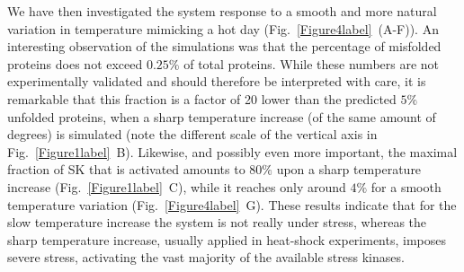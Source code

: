 \documentclass[oneside, 10pt, a4paper, twocolumn]{article}
\begin{document}
{We have then investigated} the system response to a smooth and more natural variation in temperature mimicking a hot day (Fig.~\ref{Figure4label}~(A-F)).
An interesting observation of the simulations was that the percentage of misfolded proteins does not exceed $0.25 \%$ of total proteins.
While these numbers are not experimentally validated and should therefore be interpreted with care, it is remarkable that this fraction
is a factor of 20 lower than the predicted $5\%$ unfolded proteins, when a sharp temperature increase (of the same amount of degrees) is simulated
(note the different scale of the vertical axis in Fig.~\ref{Figure1label}~B).
Likewise, and possibly even more important, the maximal fraction of SK that is activated amounts to $80\%$ upon a sharp temperature increase (Fig.~\ref{Figure1label}~C),
while it reaches only around $4\%$ for a smooth temperature variation (Fig.~\ref{Figure4label}~G).
These results indicate that for the slow temperature increase the system is not really under stress, whereas the sharp temperature increase,
usually applied in heat-shock experiments, imposes severe stress, activating the vast majority of the available stress kinases.



\end{document}
